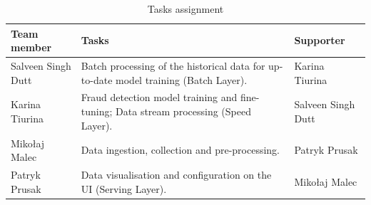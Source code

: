 \documentclass[12pt,a4paper, hidelinks]{article}
\begin{document}
\begin{table}[htbp]
\centering
\begin{tabular}{|p{4cm}|p{6cm}|p{4cm}|}
\hline
\textbf{Team member} & \textbf{Tasks} & \textbf{Supporter} \\
\hline
Salveen Singh Dutt & Batch processing of the historical data for up-to-date model training (Batch Layer). & Karina Tiurina \\
\hline
Karina Tiurina & Fraud detection model training and fine-tuning; Data stream processing (Speed Layer). & Salveen Singh Dutt \\
\hline
Mikołaj Malec & Data ingestion, collection and pre-processing. & Patryk Prusak  \\
\hline
Patryk Prusak & Data visualisation and configuration on the UI (Serving Layer). & Mikołaj Malec \\
\hline
\end{tabular}
\caption{Tasks assignment}
\end{table}
\end{document}
